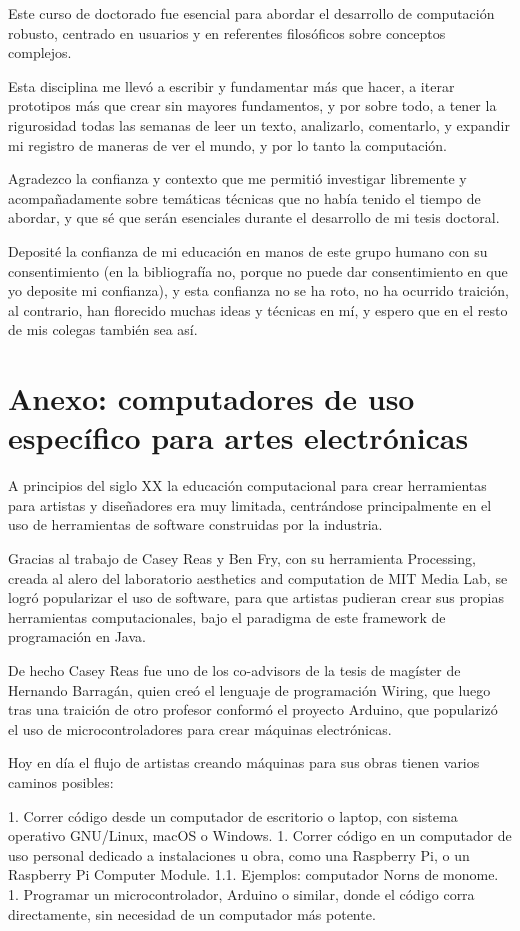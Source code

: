 \documentclass{article}
\begin{document}
Este curso de doctorado fue esencial para abordar el desarrollo de computación robusto, centrado en usuarios y en referentes filosóficos sobre conceptos complejos.

Esta disciplina me llevó a escribir y fundamentar más que hacer, a iterar prototipos más que crear sin mayores fundamentos, y por sobre todo, a tener la rigurosidad todas las semanas de leer un texto, analizarlo, comentarlo, y expandir mi registro de maneras de ver el mundo, y por lo tanto la computación.

Agradezco la confianza y contexto que me permitió investigar libremente y acompañadamente sobre temáticas técnicas que no había tenido el tiempo de abordar, y que sé que serán esenciales durante el desarrollo de mi tesis doctoral.

Deposité la confianza de mi educación en manos de este grupo humano con su consentimiento (en la bibliografía no, porque no puede dar consentimiento en que yo deposite mi confianza), y esta confianza no se ha roto, no ha ocurrido traición, al contrario, han florecido muchas ideas y técnicas en mí, y espero que en el resto de mis colegas también sea así.

\clearpage

\section{Anexo: computadores de uso específico para artes electrónicas}

A principios del siglo XX la educación computacional para crear herramientas para artistas y diseñadores era muy limitada, centrándose principalmente en el uso de herramientas de software construidas por la industria.

Gracias al trabajo de Casey Reas y Ben Fry, con su herramienta Processing, creada al alero del laboratorio aesthetics and computation de MIT Media Lab, se logró popularizar el uso de software, para que artistas pudieran crear sus propias herramientas computacionales, bajo el paradigma de este framework de programación en Java.

De hecho Casey Reas fue uno de los co-advisors de la tesis de magíster de Hernando Barragán, quien creó el lenguaje de programación Wiring, que luego tras una traición de otro profesor conformó el proyecto Arduino, que popularizó el uso de microcontroladores para crear máquinas electrónicas.

Hoy en día el flujo de artistas creando máquinas para sus obras tienen varios caminos posibles:

1. Correr código desde un computador de escritorio o laptop, con sistema operativo GNU/Linux, macOS o Windows.
1. Correr código en un computador de uso personal dedicado a instalaciones u obra, como una Raspberry Pi, o un Raspberry Pi Computer Module.
  1.1. Ejemplos: computador Norns de monome.
1. Programar un microcontrolador, Arduino o similar, donde el código corra directamente, sin necesidad de un computador más potente.

\clearpage

\printbibliography[title={Bibliografía}, heading=bibintoc]
\end{document}
